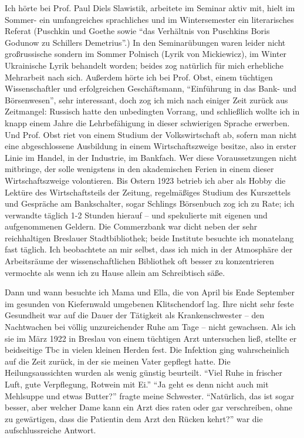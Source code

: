 \documentclass[a5paper,pagesize,10pt,twoside=true]{scrbook}
\begin{document}
Ich hörte bei Prof. Paul Diels Slawistik, arbeitete im Seminar aktiv mit, hielt im Sommer- ein umfangreiches sprachliches und im Wintersemester ein literarisches Referat (Puschkin und Goethe sowie \enquote{das Verhältnis von Puschkins Boris Godunow zu Schillers Demetrius}.) In den Seminarübungen waren leider nicht großrussische sondern im Sommer Polnisch (Lyrik von Mickiewicz), im Winter Ukrainische Lyrik behandelt worden; beides zog natürlich für mich erhebliche Mehrarbeit nach sich. Außerdem hörte ich bei Prof. Obst, einem tüchtigen Wissenschaftler und erfolgreichen Geschäftsmann, \enquote{Einführung in das Bank- und Börsenwesen}, sehr interessant, doch zog ich mich nach einiger Zeit zurück aus Zeitmangel: Russisch hatte den unbedingten Vorrang, und schließlich wollte ich in knapp einem Jahre die Lehrbefähigung in dieser schwierigen Sprache erwerben. Und Prof. Obst riet von einem Studium der Volkswirtschaft ab, sofern man nicht eine abgeschlossene Ausbildung in einem Wirtschaftszweige besitze, also in erster Linie im Handel, in der Industrie, im Bankfach. Wer diese Voraussetzungen nicht mitbringe, der solle wenigstens in den akademischen Ferien in einem dieser Wirtschaftszweige volontieren. Bis Ostern 1923 betrieb ich aber als Hobby die Lektüre des Wirtschaftsteils der Zeitung, regelmäßiges Studium des Kurszettels und Gespräche am Bankschalter, sogar Schlings Börsenbuch zog ich zu Rate; ich verwandte täglich 1-2 Stunden hierauf -- und spekulierte mit eigenen und aufgenommenen Geldern. Die Commerzbank war dicht neben der sehr reichhaltigen Breslauer Stadtbibliothek; beide Institute besuchte ich monatelang fast täglich. Ich beobachtete an mir selbst, dass ich mich in der Atmosphäre der Arbeitsräume der wissenschaftlichen Bibliothek oft besser zu konzentrieren vermochte als wenn ich zu Hause allein am Schreibtisch säße.

Dann und wann besuchte ich Mama und Ella, die von April bis Ende September im gesunden von Kiefernwald umgebenen Klitschendorf lag. Ihre nicht sehr feste Gesundheit war auf die Dauer der Tätigkeit als Krankenschwester -- den Nachtwachen bei völlig unzureichender Ruhe am Tage -- nicht gewachsen. Als ich sie im März 1922 in Breslau von einem tüchtigen Arzt untersuchen ließ, stellte er beidseitige Tbc in vielen kleinen Herden fest. Die Infektion ging wahrscheinlich auf die Zeit zurück, in der sie meinen Vater gepflegt hatte. Die Heilungsaussichten wurden als wenig günstig beurteilt. \enquote{Viel Ruhe in frischer Luft, gute Verpflegung, Rotwein mit Ei.} \enquote{Ja geht es denn nicht auch mit Mehlsuppe und etwas Butter?} fragte meine Schwester. \enquote{Natürlich, das ist sogar besser, aber welcher Dame kann ein Arzt dies raten oder gar verschreiben, ohne zu gewärtigen, dass die Patientin dem Arzt den Rücken kehrt?} war die aufschlussreiche Antwort.
\end{document}
